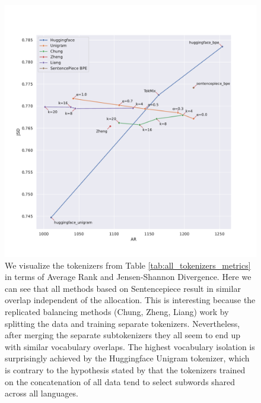 \begin{figure}[H]
    \centering
    \includegraphics[width=\textwidth]{figures/all_tokenizers_AR_vs_JSD.pdf}
    \caption{We visualize the tokenizers from Table \ref{tab:all_tokenizers_metrics} in terms of Average Rank and Jensen-Shannon Divergence. Here we can see that all methods based on Sentencepiece result in similar overlap independent of the allocation. This is interesting because the replicated balancing methods (Chung, Zheng, Liang) work by splitting the data and training separate tokenizers. Nevertheless, after merging the separate subtokenizers they all seem to end up with similar vocabulary overlaps. The highest vocabulary isolation is surprisingly achieved by the Huggingface Unigram tokenizer, which is contrary to the hypothesis stated by \citet{chung_improving_2020,zheng_allocating_2021} that the tokenizers trained on the concatenation of all data tend to select subwords shared across all languages.}
    \label{fig:all_tokenizers_AR_vs_JSD}
\end{figure}

